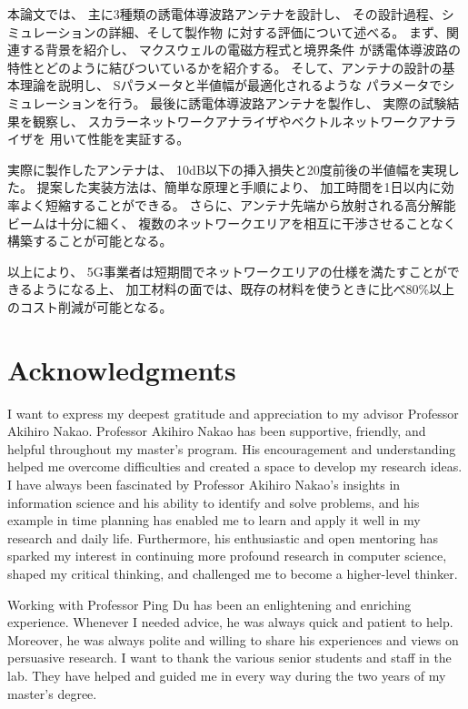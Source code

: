 \documentclass[a4paper,12pt]{report}
\begin{document}
本論文では、
主に3種類の誘電体導波路アンテナを設計し、
その設計過程、シミュレーションの詳細、そして製作物
に対する評価について述べる。
まず、関連する背景を紹介し、
マクスウェルの電磁方程式と境界条件
が誘電体導波路の特性とどのように結びついているかを紹介する。
そして、アンテナの設計の基本理論を説明し、
Sパラメータと半値幅が最適化されるような
パラメータでシミュレーションを行う。
最後に誘電体導波路アンテナを製作し、
実際の試験結果を観察し、
スカラーネットワークアナライザやベクトルネットワークアナライザを
用いて性能を実証する。

実際に製作したアンテナは、
10dB以下の挿入損失と20度前後の半値幅を実現した。
提案した実装方法は、簡単な原理と手順により、
加工時間を1日以内に効率よく短縮することができる。
さらに、アンテナ先端から放射される高分解能ビームは十分に細く、
複数のネットワークエリアを相互に干渉させることなく構築することが可能となる。

以上により、
5G事業者は短期間でネットワークエリアの仕様を満たすことができるようになる上、
加工材料の面では、既存の材料を使うときに比べ80\%以上のコスト削減が可能となる。

\newpage

\chapter*{\centering Acknowledgments}

I want to express my deepest gratitude and appreciation to my advisor
Professor Akihiro Nakao. Professor Akihiro Nakao has been supportive,
friendly, and helpful throughout my master's program. His encouragement
and understanding helped me overcome difficulties and created a space to
develop my research ideas. I have always been fascinated by Professor
Akihiro Nakao's insights in information science and his ability to identify
and solve problems, and his example in time planning has enabled me to learn
and apply it well in my research and daily life. Furthermore, his enthusiastic
and open mentoring has sparked my interest in continuing more profound
research in computer science, shaped my critical thinking, and challenged
me to become a higher-level thinker.

Working with Professor Ping Du has been an enlightening and enriching
experience. Whenever I needed advice, he was always quick and patient to
help. Moreover, he was always polite and willing to share his experiences
and views on persuasive research.
I want to thank the various senior students and staff in the lab. They
have helped and guided me in every way during the two years of my master's
degree.
\end{document}
